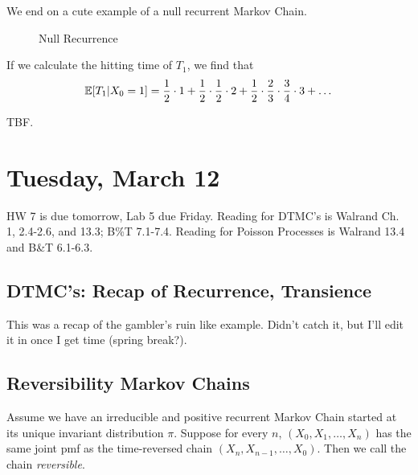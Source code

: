 \documentclass[11 pt]{scrartcl}
\begin{document}
We end on a cute example of a null recurrent Markov Chain. 
\begin{figure}[!ht]
\begin{center}
\end{center}
\caption{Null Recurrence}
\end{figure}

If we calculate the hitting time of $T_1$, we find that 
\[ \mathbb E[T_1 | X_0 = 1] = \dfrac{1}{2} \cdot 1 + \dfrac{1}{2}\cdot\dfrac{1}{2}\cdot 2 + \dfrac{1}{2}\cdot\dfrac{2}{3}\cdot\dfrac{3}{4}\cdot 3 + \dots \]

TBF. 

\newpage
\section{Tuesday, March 12}
HW 7 is due tomorrow, Lab 5 due Friday. Reading for DTMC's is Walrand Ch. 1, 2.4-2.6, and 13.3; B\%T 7.1-7.4. Reading for Poisson Processes is Walrand 13.4 and B\&T 6.1-6.3. 

\subsection{DTMC's: Recap of Recurrence, Transience}
This was a recap of the gambler's ruin like example. Didn't catch it, but I'll edit it in once I get time (spring break?).

\subsection{Reversibility Markov Chains}
Assume we have an irreducible and positive recurrent Markov Chain started at its unique invariant distribution $\pi$. Suppose for every $n$, $(X_0, X_1, \dots, X_n)$ has the same joint pmf as the time-reversed chain $(X_n, X_{n-1}, \dots, X_0)$. Then we call the chain \emph{reversible}. 
\end{document}
